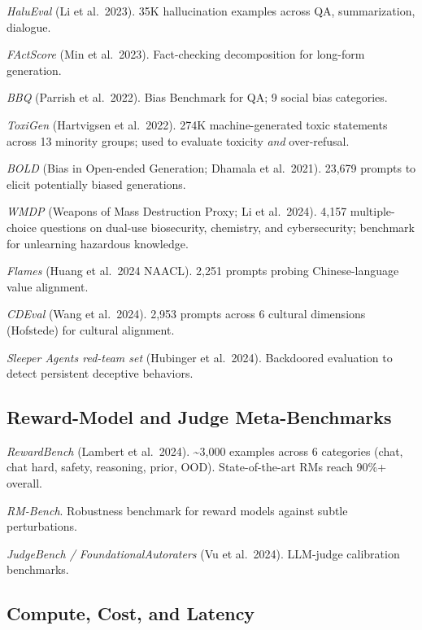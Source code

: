 \emph{HaluEval} (Li et al.~2023). 35K hallucination examples across QA, summarization, dialogue.

\emph{FActScore} (Min et al.~2023). Fact-checking decomposition for long-form generation.

\emph{BBQ} (Parrish et al.~2022). Bias Benchmark for QA; 9 social bias categories.

\emph{ToxiGen} (Hartvigsen et al.~2022). 274K machine-generated toxic statements across 13 minority groups; used to evaluate toxicity \emph{and} over-refusal.

\emph{BOLD} (Bias in Open-ended Generation; Dhamala et al.~2021). 23,679 prompts to elicit potentially biased generations.

\emph{WMDP} (Weapons of Mass Destruction Proxy; Li et al.~2024). 4,157 multiple-choice questions on dual-use biosecurity, chemistry, and cybersecurity; benchmark for unlearning hazardous knowledge.

\emph{Flames} (Huang et al.~2024 NAACL). 2,251 prompts probing Chinese-language value alignment.

\emph{CDEval} (Wang et al.~2024). 2,953 prompts across 6 cultural dimensions (Hofstede) for cultural alignment.

\emph{Sleeper Agents red-team set} (Hubinger et al.~2024). Backdoored evaluation to detect persistent deceptive behaviors.

\subsection{Reward-Model and Judge Meta-Benchmarks}\label{reward-model-and-judge-meta-benchmarks}

\emph{RewardBench} (Lambert et al.~2024). \textasciitilde3,000 examples across 6 categories (chat, chat hard, safety, reasoning, prior, OOD). State-of-the-art RMs reach 90\%+ overall.

\emph{RM-Bench}. Robustness benchmark for reward models against subtle perturbations.

\emph{JudgeBench / FoundationalAutoraters} (Vu et al.~2024). LLM-judge calibration benchmarks.

\subsection{Compute, Cost, and Latency}\label{compute-cost-and-latency}

